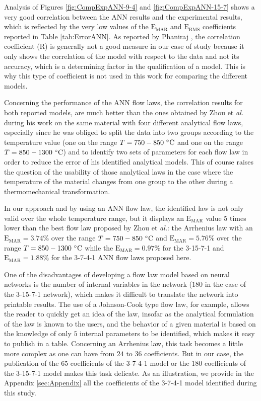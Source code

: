 \documentclass[algorithms,article,submit,pdftex,moreauthors]{Definitions/mdpi}
\makeatletter
\DeclareRobustCommand{\eal}{et \emph{al.}\@\xspace}
\DeclareRobustCommand{\RMSE}{\text{E}_\text{RMS}}
\DeclareRobustCommand{\MARE}{\text{E}_\text{MAR}}
\DeclareRobustCommand{\R}{\text{R}}
\makeatother
\begin{document}
Analysis of Figures \ref{fig:CompExpANN-9-4} and \ref{fig:CompExpANN-15-7} shows a very good correlation between the ANN results and the experimental results, which is reflected by the very low values of the $\MARE$ and $\RMSE$ coefficients reported in Table \ref{tab:ErrorANN}.
As reported by Phaniraj \cite{Phaniraj-2003}, the correlation coefficient ($\R$) is generally not a good measure in our case of study because it only shows the correlation of the model with respect to the data and not its accuracy, which is a determining factor in the qualification of a model.
This is why this type of coefficient is not used in this work for comparing the different models.

Concerning the performance of the ANN flow laws, the correlation results for both reported models, are much better than the ones obtained by Zhou \eal \cite{Zhou-2020} during his work on the same material with four different analytical flow laws, especially since he was obliged to split the data into two groups according to the temperature value (one on the range $T=750-850~\celsius$ and one on the range $T=850-1300~\celsius$) and to identify two sets of parameters for each flow law in order to reduce the error of his identified analytical models.
This of course raises the question of the usability of those analytical laws in the case where the temperature of the material changes from one group to the other during a thermomechanical transformation.

In our approach and by using an ANN flow law, the identified law is not only valid over the whole temperature range, but it displays an $\MARE$ value $5$ times lower than the best flow law proposed by Zhou \eal \cite{Zhou-2020}: the Arrhenius law with an $\MARE=3.74\%$ over the range $T=750-850~\celsius$ and $\MARE=5.76\%$ over the range $T=850-1300~\celsius$ while the $\MARE=0.97\%$ for the 3-15-7-1 and $\MARE=1.88\%$ for the 3-7-4-1 ANN flow laws proposed here.

One of the disadvantages of developing a flow law model based on neural networks is the number of internal variables in the network ($180$ in the case of the 3-15-7-1 network), which makes it difficult to translate the network into printable results.
The use of a Johnson-Cook type flow law, for example, allows the reader to quickly get an idea of the law, insofar as the analytical formulation of the law is known to the users, and the behavior of a given material is based on the knowledge of only $5$ internal parameters to be identified, which makes it easy to publish in a table.
Concerning an Arrhenius law, this task becomes a little more complex as one can have from $24$ to $36$ coefficients.
But in our case, the publication of the $65$ coefficients of the 3-7-4-1 model or the $180$ coefficients of the 3-15-7-1 model makes this task delicate.
As an illustration, we provide in the Appendix \ref{sec:Appendix} all the coefficients of the 3-7-4-1 model identified during this study.
\end{document}
